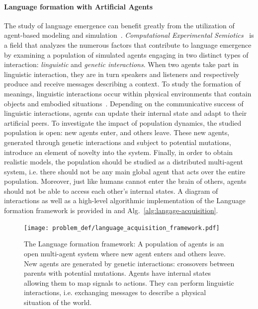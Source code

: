\paragraph{Language formation with Artificial Agents}

The study of language emergence can benefit greatly from the utilization of agent-based modeling and simulation~\citep{Hurford1989BiologicalEO,birghton2002compositional,cangelosi2002simulating,steels2015talkingheads,kirby2014iterated}. \textit{Computational Experimental Semiotics}~\citep{galantucci2011experimental} is a field that analyzes the numerous factors that contribute to language emergence by examining a population of simulated agents engaging in two distinct types of interaction: \textit{linguistic} and \textit{genetic interactions}. When two agents take part in linguistic interaction, they are in turn speakers and listeners and respectively produce and receive messages describing a context. To study the formation of meanings, linguistic interactions occur within physical environments that contain objects and embodied situations~\citep{steels2012grounded}. Depending on the communicative success of linguistic interactions, agents can update their internal state and adapt to their artificial peers. To investigate the impact of population dynamics, the studied population is open: new agents enter, and others leave. These new agents, generated through genetic interactions and subject to potential mutations, introduce an element of novelty into the system. Finally, in order to obtain realistic models, the population should be studied as a distributed multi-agent system, i.e. there should not be any main global agent that acts over the entire population. Moreover, just like humans cannot enter the brain of others, agents should not be able to access each other's internal states.  A diagram of interactions as well as a high-level algorithmic implementation of the Language formation framework is provided in  and Alg.~\ref{alg:langage-acquisition}.
\begin{figure}[!h]
\centering
\vspace{-.5cm}
\texttt{[image: problem\_def/language\_acquisition\_framework.pdf]}	
\caption{The Language formation framework: A population of agents is an open multi-agent system where new agent enters and others leave. New agents are generated by genetic interactions: crossovers between parents with potential mutations. Agents have internal states allowing them to map signals to actions. They can perform linguistic interactions, i.e. exchanging messages to describe a physical situation of the world.}
\label{fig:language_acquisition_framework}
\end{figure}
